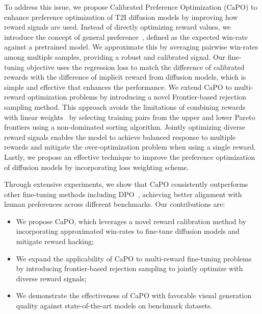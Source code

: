 
To address this issue, we propose Calibrated Preference Optimization (CaPO) to enhance preference optimization of T2I diffusion models by improving how reward signals are used. 
Instead of directly optimizing reward values, we introduce the concept of general preference~\citep{azar2024general}, defined as the expected win-rate against a pretrained model. 
We approximate this by averaging pairwise win-rates among multiple samples, providing a robust and calibrated signal.
Our fine-tuning objective uses the regression loss to match the difference of calibrated rewards with the difference of implicit reward from diffusion models, which is simple and effective that enhances the performance.
We extend CaPO to multi-reward optimization problems by introducing a novel Frontier-based rejection sampling method.
This approach avoids the limitations of combining rewards with linear weights~\citep{clark2023directly, deng2024prdp} by selecting training pairs from the upper and lower Pareto frontiers using a non-dominated sorting algorithm. Jointly optimizing diverse reward signals enables the model to achieve balanced response to multiple rewards and mitigate the over-optimization problem when using a single reward.
Lastly, we propose an effective technique to improve the preference optimization of diffusion models by incorporating loss weighting scheme. 


Through extensive experiments, we show that CaPO consistently outperforms other fine-tuning methods including DPO~\citep{wallace2023diffusion}, achieving better alignment with human preferences across different benchmarks. 
Our contributions are:
\begin{itemize}
    \item We propose CaPO, which leverages a novel reward calibration method by incorporating approximated win-rates to fine-tune diffusion models and mitigate reward hacking;
    \item We expand the applicability of CaPO to multi-reward fine-tuning problems by introducing frontier-based rejection sampling to jointly optimize with diverse reward signals; 
    \item We demonstrate the effectiveness of CaPO with favorable visual generation quality against state-of-the-art models on benchmark datasets.
\end{itemize}
